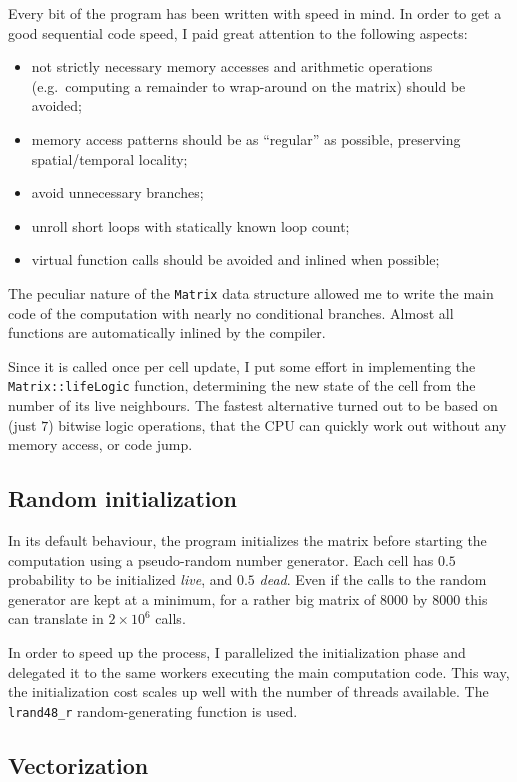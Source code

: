 \documentclass[a4paper,11pt]{article}
\newcommand{\code}[1]{\texttt{#1}}
\def\+{\discretionary{}{}{}}
\begin{document}
Every bit of the program has been written with speed in mind. In order to get a good sequential code speed, I paid great attention to the following aspects:
\begin{itemize}
\item not strictly necessary memory accesses and arithmetic operations (e.g.\ computing a remainder to wrap-around on the matrix) should be avoided;
\item memory access patterns should be as ``regular'' as possible, preserving spatial/temporal locality;
\item avoid unnecessary branches;
\item unroll short loops with statically known loop count;
\item virtual function calls should be avoided and inlined when possible;
\end{itemize}

The peculiar nature of the \code{Matrix} data structure allowed me to write the main code of the computation with nearly no conditional branches. Almost all functions are automatically inlined by the compiler.

Since it is called once per cell update, I put some effort in implementing the \code{Matrix::\+lifeLogic} function, determining the new state of the cell from the number of its live neighbours. The fastest alternative turned out to be based on (just $7$) bitwise logic operations, that the CPU can quickly work out without any memory access, or code jump.

\subsection{Random initialization}

In its default behaviour, the program initializes the matrix before starting the computation using a pseudo-random number generator. Each cell has $0.5$ probability to be initialized \emph{live}, and $0.5$ \emph{dead}. Even if the calls to the random generator are kept at a minimum, for a rather big matrix of $8000$ by $8000$ this can translate in $2 \times 10^6$ calls.

In order to speed up the process, I parallelized the initialization phase and delegated it to the same workers executing the main computation code. This way, the initialization cost scales up well with the number of threads available. The \code{lrand48\_r} random-generating function is used.

\subsection{Vectorization}
\end{document}
